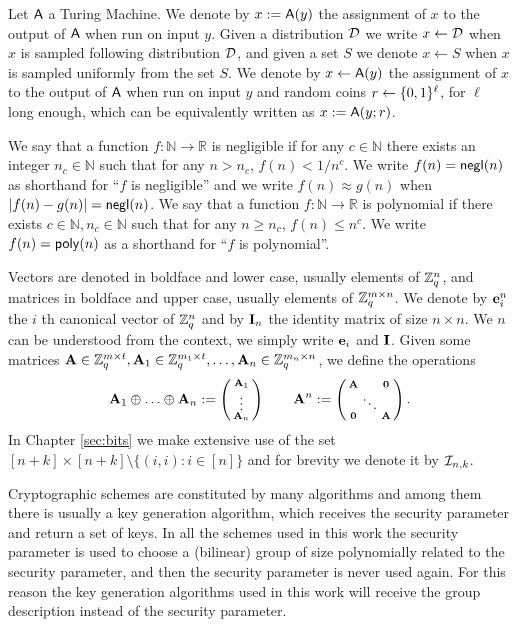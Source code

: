 Let $\mathsf{A}$ a Turing Machine. We denote by $x:=\mathsf{A}(y)$ the assignment of $x$ to the output of $\mathsf{A}$ when run on input $y$. Given a distribution $\mathcal{D}$ we write $x\gets\mathcal{D}$ when $x$ is sampled following distribution $\mathcal{D}$, and given a set $S$ we denote $x\gets S$ when $x$ is sampled uniformly from the set $S$. We denote by $x\gets\mathsf{A}(y)$ the assignment of $x$ to the output of $\mathsf{A}$ when run on input $y$ and random coins $r\gets\{0,1\}^\ell$, for $\ell$ long enough, which can be equivalently written as $x:=\mathsf{A}(y;r)$. 

We say that a function $f:\mathbb{N}\to\mathbb{R}$ is negligible if for any $c\in\mathbb{N}$ there exists an integer $n_c\in\mathbb{N}$ such that for any $n> n_c$, $f(n)<1/n^c$. We write $f(n)=\mathsf{negl}(n)$ as shorthand for ``$f$ is negligible'' and we write $f(n)\approx g(n)$ when $|f(n)-g(n)|=\mathsf{negl}(n)$. We say that a function $f:\mathbb{N}\to\mathbb{R}$ is polynomial if there exists $c\in\mathbb{N},n_c\in\mathbb{N}$ such that for any $n\geq n_c$, $f(n)\leq n^c$. We write $f(n)=\mathsf{poly}(n)$ as a shorthand for ``$f$ is polynomial''.

Vectors are denoted in boldface and lower case, usually elements of $\mathbb{Z}_q^n$, and matrices in boldface and upper case, usually elements of $\mathbb{Z}_q^{m\times n}$. We denote by $\mathbf{e}_i^n$ the $i$ th canonical vector of $\mathbb{Z}_q^n$ and by $\mathbf{{I}}_{n}$ the identity matrix of size $n\times n$. We $n$ can be understood from the context, we simply write $\mathbf{e}_i$ and $\mathbf{{I}}$. Given some matrices $\mathbf{{A}}\in\mathbb{Z}_q^{m\times t},\mathbf{{A}}_1\in\mathbb{Z}_q^{m_1\times t},\ldots,\mathbf{{A}}_n\in\mathbb{Z}_q^{m_n\times n}$, we define the operations
 $$\mathbf{A}_1 \oplus \ldots \oplus \mathbf{A}_n:=\left(\begin{smallmatrix} \mathbf{A}_1 \\ \vdots \\  \mathbf{A}_n\end{smallmatrix}\right) \qquad 
\mathbf{{A}}^n:=\left(\begin{smallmatrix} \mathbf{{A}} &  & \mathbf{{0}} \\   & \ddots &   \\ \mathbf{{0}} &  & \mathbf{{A}}
\end{smallmatrix}\right).$$
In Chapter \ref{sec:bits} we make extensive use of the set $[n+k]\times[n+k]\setminus\{(i,i):i\in[n]\}$ and for brevity we denote it by $\mathcal{I}_{n,k}$.

Cryptographic schemes are constituted by many algorithms and among them there is usually a key generation algorithm, which receives the security parameter and return a set of keys. In all the schemes used in this work the security parameter is used to choose a (bilinear) group of size polynomially related to the security parameter, and then the security parameter is never used again. For this reason the key generation algorithms used in this work will receive the group description instead of the security parameter.
